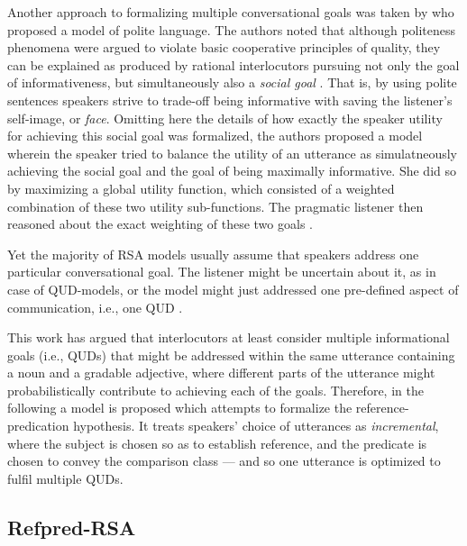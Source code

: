 Another approach to formalizing multiple conversational goals was taken by \textcite{yoon2016talking} who proposed a model of polite language. The authors noted that although politeness phenomena were argued to violate basic cooperative principles of quality, they can be explained as produced by rational interlocutors pursuing not only the goal of informativeness, but simultaneously also a \emph{social goal} \parencite[cf.][]{brown1987politeness}. That is, by using polite sentences speakers strive to trade-off being informative with saving the listener's self-image, or \emph{face}. Omitting here the details of how exactly the speaker utility for achieving this social goal was formalized, the authors proposed a model wherein the speaker tried to balance the utility of an utterance as simulatneously achieving the social goal and the goal of being maximally informative. She did so by maximizing a global utility function, which consisted of a weighted combination of these two utility sub-functions. The pragmatic listener then reasoned about the exact weighting of these two goals \parencite{yoon2016talking}. 

Yet the majority of RSA models usually assume that speakers address one particular conversational goal. The listener might be uncertain about it, as in case of QUD-models, or the model might just addressed one pre-defined aspect of communication, i.e., one QUD \parencite[see][for an excellent overview of various RSA models]{problang}. 

This work has argued that interlocutors at least consider multiple informational goals (i.e., QUDs) that might be addressed within the same utterance containing a noun and a gradable adjective, where different parts of the utterance might probabilistically contribute to achieving each of the goals. Therefore, in the following a model is proposed which attempts to formalize the reference-predication hypothesis. It treats speakers' choice of utterances as \emph{incremental}, where the subject is chosen so as to establish reference, and the predicate is chosen to convey the comparison class --- and so one utterance is optimized to fulfil multiple QUDs. 

\subsection{Refpred-RSA}

